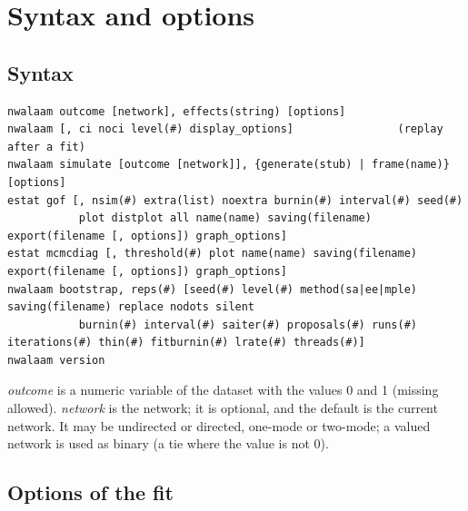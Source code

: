 \chapter{Syntax and options}\label{ch:options}

\section{Syntax}

\begin{lstlisting}
nwalaam outcome [network], effects(string) [options]
nwalaam [, ci noci level(#) display_options]                (replay after a fit)
nwalaam simulate [outcome [network]], {generate(stub) | frame(name)} [options]
estat gof [, nsim(#) extra(list) noextra burnin(#) interval(#) seed(#)
           plot distplot all name(name) saving(filename) export(filename [, options]) graph_options]
estat mcmcdiag [, threshold(#) plot name(name) saving(filename) export(filename [, options]) graph_options]
nwalaam bootstrap, reps(#) [seed(#) level(#) method(sa|ee|mple) saving(filename) replace nodots silent
           burnin(#) interval(#) saiter(#) proposals(#) runs(#) iterations(#) thin(#) fitburnin(#) lrate(#) threads(#)]
nwalaam version
\end{lstlisting}
\emph{outcome} is a numeric variable of the dataset with the values 0 and 1 (missing allowed). \emph{network} is the network; it is optional, and the default is the current network. It may be undirected or directed, one-mode or two-mode; a valued network is used as binary (a tie where the value is not 0).

\section{Options of the fit}

